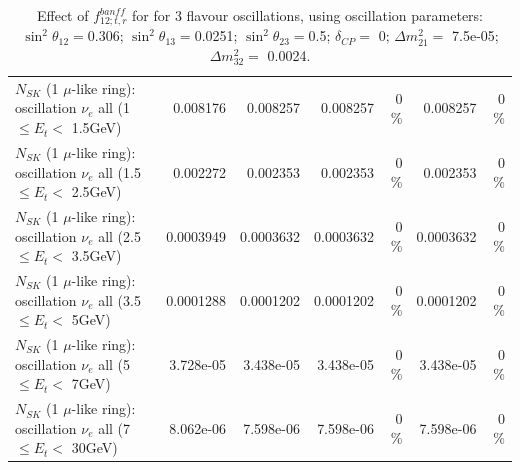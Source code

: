 \begin{table}
\begin{tabular}{| l | r | r | r  r | r  r |}
$N_{SK}$ (1 $\mu$-like ring): oscillation $\nu_{e}$ all (1 $\leq E_{t} <$ 1.5GeV) &        0.008176 &        0.008257 &        0.008257 &        0 \%  &        0.008257 &        0 \%  \\ 
$N_{SK}$ (1 $\mu$-like ring): oscillation $\nu_{e}$ all (1.5 $\leq E_{t} <$ 2.5GeV) &        0.002272 &        0.002353 &        0.002353 &        0 \%  &        0.002353 &        0 \%  \\ 
$N_{SK}$ (1 $\mu$-like ring): oscillation $\nu_{e}$ all (2.5 $\leq E_{t} <$ 3.5GeV) &       0.0003949 &       0.0003632 &       0.0003632 &        0 \%  &       0.0003632 &        0 \%  \\ 
$N_{SK}$ (1 $\mu$-like ring): oscillation $\nu_{e}$ all (3.5 $\leq E_{t} <$ 5GeV) &       0.0001288 &       0.0001202 &       0.0001202 &        0 \%  &       0.0001202 &        0 \%  \\ 
 $N_{SK}$ (1 $\mu$-like ring): oscillation $\nu_{e}$ all (5 $\leq E_{t} <$ 7GeV) &       3.728e-05 &       3.438e-05 &       3.438e-05 &        0 \%  &       3.438e-05 &        0 \%  \\ 
$N_{SK}$ (1 $\mu$-like ring): oscillation $\nu_{e}$ all (7 $\leq E_{t} <$ 30GeV) &       8.062e-06 &       7.598e-06 &       7.598e-06 &        0 \%  &       7.598e-06 &        0 \%  \\ 
\hline
\hline
\end{tabular}
\caption{ Effect of $f_{12; t, r}^{banff}$ for for 3 flavour oscillations, using oscillation parameters:  $\sin^2\theta_{12} = $0.306; $\sin^2\theta_{13} = $0.0251; $\sin^2\theta_{23} = $0.5; $\delta_{CP} = $        0; $\Delta m^2_{21} = $    7.5e-05; $\Delta m^2_{32} = $    0.0024. }
\label{tab:num_banff_12_1RmuT_3f_osc_t13:0.0251}
\end{table}
\clearpage
